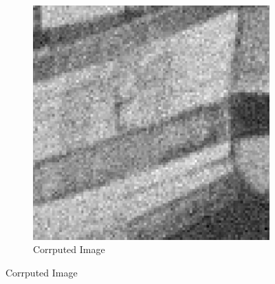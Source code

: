 \documentclass{article}
\begin{document}
\begin{figure}[!htb]
\begin{center}
\begin{subfigure}[b]{0.4\textwidth}
        \includegraphics[width=\textwidth]{../report_images/noisy.png}
        \caption{Corrputed Image}
      \end{subfigure}
    \end{center}
  \end{figure}
\end{document}
